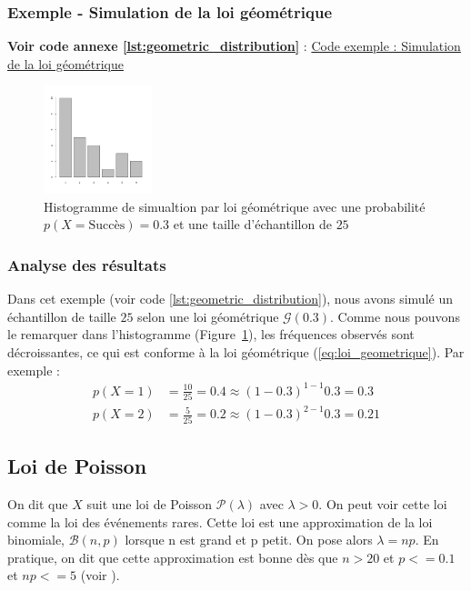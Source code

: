       \subsubsection{Exemple - Simulation de la loi géométrique}

      \textbf{Voir code annexe \ref{lst:geometric_distribution}} : \hyperlink{\ref{lst:geometric_distribution}}{Code exemple : Simulation de la loi géométrique}

      \begin{figure}[H]
        \centering
        \includegraphics[width=0.28\textwidth]{4_attachments/figures/output4.png}
        \caption{Histogramme de simualtion par loi géométrique avec une probabilité $p(X= \text{Succès})=0.3$ et une taille d'échantillon de $25$}
        \label{fig:histogramme_ech}
      \end{figure}

    \subsubsection{Analyse des résultats}
    Dans cet exemple (voir code \ref{lst:geometric_distribution}), nous avons simulé un échantillon de taille $25$ selon une loi géométrique $\mathcal G(0.3)$.
    Comme nous pouvons le remarquer dans l'histogramme (Figure~\ref{fig:histogramme_ech}), les fréquences observés sont décroissantes, ce qui est conforme à la loi géométrique (\ref{eq:loi_geometrique}). Par exemple :
    \[
      \begin{array}{ll}
        p(X=1) &= \frac{10}{25} = 0.4 \approx (1-0.3)^{1-1}0.3 = 0.3 \\ 
        p(X=2) &= \frac{5}{25} = 0.2 \approx (1-0.3)^{2-1}0.3 = 0.21
      \end{array}
    \]

    \subsection{Loi de Poisson}
      On dit que $X$ suit une loi de Poisson $\mathcal P(\lambda)$ avec $\lambda > 0$.
      On peut voir cette loi comme la loi des événements rares. 
      Cette loi est une approximation de la loi binomiale, $\mathcal B(n,p)$ lorsque n est grand et p petit. 
      On pose alors $\lambda=np$. En pratique, on dit que cette approximation est bonne dès que $n>20$ et $p<=0.1$ et $np<=5$ (voir \cite{poissonlaw}).

